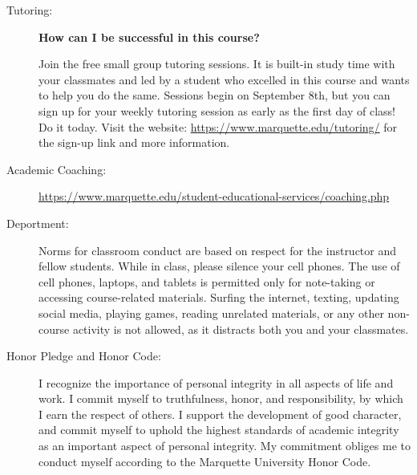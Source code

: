 \documentclass[10pt]{article}
\begin{document}
\begin{description}
\item [Tutoring:] \textbf{How can I be successful in this course?}

Join the free small group tutoring sessions. It is built-in study time with your classmates and led by a student who excelled in this course and wants to help you do the same. Sessions begin on September 8th, but you can sign up for your weekly tutoring session as early as the first day of class!   Do it today.  Visit the website: \url{https://www.marquette.edu/tutoring/} for the sign-up link and more information.

\item[Academic Coaching:] \url{https://www.marquette.edu/student-educational-services/coaching.php}

\item[Deportment:] Norms for classroom conduct are based on respect for the instructor and fellow students. While in class, please silence your cell phones. The use of cell phones, laptops, and tablets is permitted only for note-taking or accessing course-related materials. Surfing the internet, texting, updating social media, playing games, reading unrelated materials, or any other non-course activity is not allowed, as it distracts both you and your classmates.

\item[Honor Pledge and Honor Code:]  I recognize the importance of personal integrity in all aspects of life and work. I commit myself to truthfulness, honor, and responsibility, by which I earn the respect of others. I support the development of good character, and commit myself to uphold the highest standards of academic integrity as an important aspect of personal integrity. My commitment obliges me to conduct myself according to the Marquette University Honor Code.


\end{description}
\end{document}
